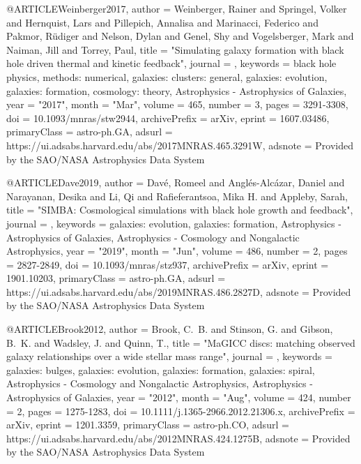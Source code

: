 \documentclass[useAMS,usenatbib]{mnras}
\begin{document}
@ARTICLE{Weinberger2017,
       author = {{Weinberger}, Rainer and {Springel}, Volker and {Hernquist}, Lars and
         {Pillepich}, Annalisa and {Marinacci}, Federico and
         {Pakmor}, R{\"u}diger and {Nelson}, Dylan and {Genel}, Shy and
         {Vogelsberger}, Mark and {Naiman}, Jill and {Torrey}, Paul},
        title = "{Simulating galaxy formation with black hole driven thermal and kinetic feedback}",
      journal = {\mnras},
     keywords = {black hole physics, methods: numerical, galaxies: clusters: general, galaxies: evolution, galaxies: formation, cosmology: theory, Astrophysics - Astrophysics of Galaxies},
         year = "2017",
        month = "Mar",
       volume = {465},
       number = {3},
        pages = {3291-3308},
          doi = {10.1093/mnras/stw2944},
archivePrefix = {arXiv},
       eprint = {1607.03486},
 primaryClass = {astro-ph.GA},
       adsurl = {https://ui.adsabs.harvard.edu/abs/2017MNRAS.465.3291W},
      adsnote = {Provided by the SAO/NASA Astrophysics Data System}
}

@ARTICLE{Dave2019,
       author = {{Dav{\'e}}, Romeel and {Angl{\'e}s-Alc{\'a}zar}, Daniel and
         {Narayanan}, Desika and {Li}, Qi and {Rafieferantsoa}, Mika H. and
         {Appleby}, Sarah},
        title = "{SIMBA: Cosmological simulations with black hole growth and feedback}",
      journal = {\mnras},
     keywords = {galaxies: evolution, galaxies: formation, Astrophysics - Astrophysics of Galaxies, Astrophysics - Cosmology and Nongalactic Astrophysics},
         year = "2019",
        month = "Jun",
       volume = {486},
       number = {2},
        pages = {2827-2849},
          doi = {10.1093/mnras/stz937},
archivePrefix = {arXiv},
       eprint = {1901.10203},
 primaryClass = {astro-ph.GA},
       adsurl = {https://ui.adsabs.harvard.edu/abs/2019MNRAS.486.2827D},
      adsnote = {Provided by the SAO/NASA Astrophysics Data System}
}

@ARTICLE{Brook2012,
       author = {{Brook}, C.~B. and {Stinson}, G. and {Gibson}, B.~K. and {Wadsley}, J. and
         {Quinn}, T.},
        title = "{MaGICC discs: matching observed galaxy relationships over a wide stellar mass range}",
      journal = {\mnras},
     keywords = {galaxies: bulges, galaxies: evolution, galaxies: formation, galaxies: spiral, Astrophysics - Cosmology and Nongalactic Astrophysics, Astrophysics - Astrophysics of Galaxies},
         year = "2012",
        month = "Aug",
       volume = {424},
       number = {2},
        pages = {1275-1283},
          doi = {10.1111/j.1365-2966.2012.21306.x},
archivePrefix = {arXiv},
       eprint = {1201.3359},
 primaryClass = {astro-ph.CO},
       adsurl = {https://ui.adsabs.harvard.edu/abs/2012MNRAS.424.1275B},
      adsnote = {Provided by the SAO/NASA Astrophysics Data System}
}
\end{document}
